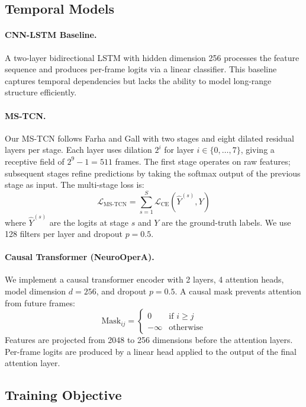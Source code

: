 \documentclass[10pt,twocolumn]{article}
\begin{document}
\subsection{Temporal Models}

\paragraph{CNN-LSTM Baseline.} A two-layer bidirectional LSTM with hidden dimension 256 processes the feature sequence and produces per-frame logits via a linear classifier. This baseline captures temporal dependencies but lacks the ability to model long-range structure efficiently.

\paragraph{MS-TCN.} Our MS-TCN follows Farha and Gall \cite{farha2019mstcn} with two stages and eight dilated residual layers per stage. Each layer uses dilation $2^i$ for layer $i \in \{0,\ldots,7\}$, giving a receptive field of $2^9 - 1 = 511$ frames. The first stage operates on raw features; subsequent stages refine predictions by taking the softmax output of the previous stage as input. The multi-stage loss is:
\[
\mathcal{L}_\text{MS-TCN} = \sum_{s=1}^{S} \mathcal{L}_\text{CE}(\hat{Y}^{(s)}, Y)
\]
where $\hat{Y}^{(s)}$ are the logits at stage $s$ and $Y$ are the ground-truth labels. We use 128 filters per layer and dropout $p = 0.5$.

\paragraph{Causal Transformer (NeuroOperA).} We implement a causal transformer encoder with 2 layers, 4 attention heads, model dimension $d = 256$, and dropout $p = 0.5$. A causal mask prevents attention from future frames:
\[
\text{Mask}_{ij} = \begin{cases} 0 & \text{if } i \geq j \\ -\infty & \text{otherwise} \end{cases}
\]
Features are projected from 2048 to 256 dimensions before the attention layers. Per-frame logits are produced by a linear head applied to the output of the final attention layer.

\subsection{Training Objective}
\end{document}
